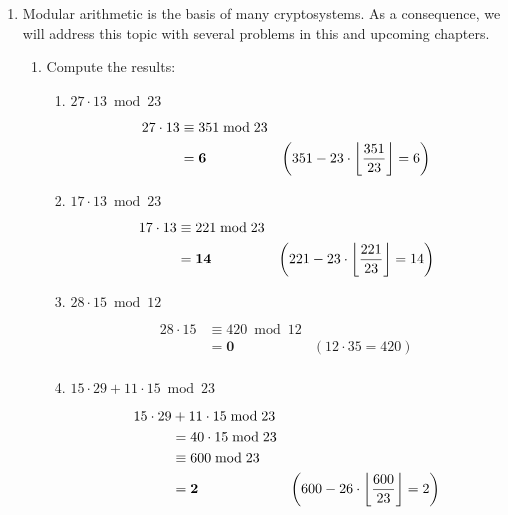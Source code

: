 \documentclass[12pt]{article}
\DeclarePairedDelimiter\floor{\lfloor}{\rfloor}
\newenvironment{answer}
{ \begin{tcolorbox}[halign=left]
    }
    {  
  \end{tcolorbox}
}
\begin{document}
\begin{enumerate}
\begin{enumerate}
  \end{enumerate}

\item Modular arithmetic is the basis of many cryptosystems. As a consequence, we will address this topic with several problems in this and upcoming chapters.
  \begin{enumerate}
  \item Compute the results:
    \begin{enumerate}
    \item $27 \cdot 13 \bmod 23$
      \begin{answer}
        {\begin{align*}
           27 \cdot 13 & \equiv 351 \bmod 23 & \\
                                & = \bm{6} & \left(351 - 23 \cdot \floor*{\frac{351}{23}} = 6 \right) \\
         \end{align*}}
     \end{answer}
   \item $17 \cdot 13 \bmod 23$
     \begin{answer}
       {\begin{align*}
          17 \cdot 13 & \equiv 221 \bmod 23 & \\
                      & = \bm{14} & \left(221 - 23 \cdot \floor*{\frac{221}{23}} = 14 \right)\\
        \end{align*}}
    \end{answer}
    \newpage
  \item $28 \cdot 15 \bmod 12$
    \begin{answer}
      {\begin{align*}
           28 \cdot 15 & \equiv 420 \bmod 12 & \\
                                & = \bm{0} & \left(12\cdot 35 = 420 \right)\\
         \end{align*}}
     \end{answer}
   \item $15 \cdot 29 + 11 \cdot 15 \bmod 23$
     \begin{answer}
        {\begin{align*}
           15 \cdot 29  &+ 11 \cdot 15 \bmod 23 & \\
                        &= 40 \cdot 15 \bmod 23 & \\
                        & \equiv 600 \bmod 23 & \\
                        & = \bm{2} & \left(600 - 26 \cdot \floor*{\frac{600}{23}} = 2 \right)\\
         \end{align*}}
     \end{answer}
   \end{enumerate}
   

\end{enumerate}
\end{enumerate}
\end{document}
